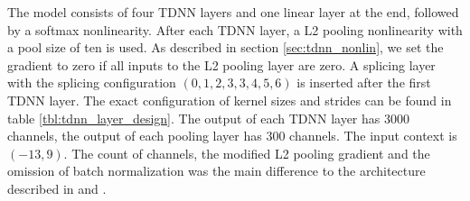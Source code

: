 The model consists of four TDNN layers and one linear layer at the end, followed by a softmax nonlinearity. After each TDNN layer, a L2 pooling nonlinearity with a pool size of ten is used. As described in section \ref{sec:tdnn_nonlin}, we set the gradient to zero if all inputs to the L2 pooling layer are zero. A splicing layer with the splicing configuration $(0, 1, 2, 3, 3, 4, 5, 6)$ is inserted after the first TDNN layer. The exact configuration of kernel sizes and strides can be found in table \ref{tbl:tdnn_layer_design}. The output of each TDNN layer has 3000 channels, the output of each pooling layer has 300 channels. The input context is $(-13, 9)$. The count of channels, the modified L2 pooling gradient and the omission of batch normalization was the main difference to the architecture described in \cite{peddinti2015reverberation} and \cite{peddinti2015jhu}. 
